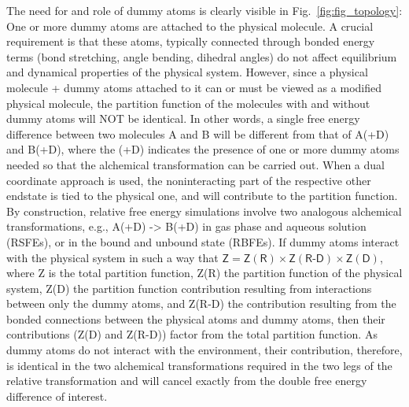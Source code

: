 \documentclass[9pt,bestpractices]{livecoms}
\begin{document}
The need for and role of dummy atoms is clearly visible in Fig.~\ref{fig:fig_topology}: One or more dummy atoms are attached to the physical molecule. A crucial requirement is that these atoms, typically connected through bonded energy terms (bond stretching, angle bending, dihedral angles) do not affect equilibrium and dynamical properties of the physical system. However, since a physical molecule + dummy atoms attached to it can or must be viewed as a modified physical molecule, the partition function of the molecules with and without dummy atoms will NOT be identical. In other words, a single free energy difference between two molecules A and B will be different from that of A(+D) and B(+D), where the (+D) indicates the presence of one or more dummy atoms needed so that the alchemical transformation can be carried out. When a dual coordinate approach is used, the noninteracting part of the respective other endstate is tied to the physical one, and will contribute to the partition function. By construction, relative free energy simulations involve two analogous alchemical transformations, e.g., A(+D) -> B(+D) in gas phase and aqueous solution (RSFEs), or in the bound and unbound state (RBFEs). If dummy atoms  interact with the physical system in such a way that $\mathsf{Z = Z(R) \times Z(R\text{-}D) \times Z(D)}$, where Z is the total partition function, Z(R) the partition function of the physical system, Z(D) the partition function contribution resulting from interactions between only the dummy atoms, and Z(R-D) the contribution resulting from the bonded connections between the physical atoms and dummy atoms, then their contributions (Z(D) and Z(R-D)) factor from the total partition function. As dummy atoms do not interact with the environment, their contribution, therefore, is identical in the two alchemical transformations required in the two legs of the relative transformation and will cancel exactly from the double free energy difference of interest.
\end{document}
